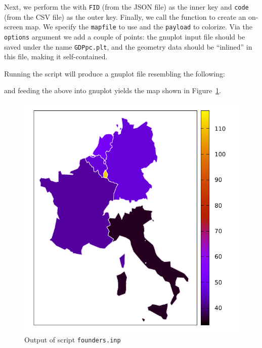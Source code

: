 \documentclass{article}
\begin{document}
Next, we perform the  with \texttt{FID} (from the JSON file)
as the inner key and \texttt{code} (from the CSV file) as the outer
key. Finally, we call the  function to create an
on-screen map. We specify the \texttt{mapfile} to use and the
\texttt{payload} to colorize. Via the \texttt{options} argument we add
a couple of points: the \textsf{gnuplot} input file should be saved
under the name \texttt{GDPpc.plt}, and the geometry data should be
``inlined'' in this file, making it self-contained.

Running the script will produce a \textsf{gnuplot} file resembling the
following:


and feeding the above into \textsf{gnuplot} yields the map shown in
Figure~\ref{fig:founders}.

\begin{figure}[htbp]
  \begin{center}
  \includegraphics[scale=0.9]{GDPpc.pdf}
\end{center}
\caption{Output of script \texttt{founders.inp}}
\label{fig:founders}
\end{figure}
\end{document}
